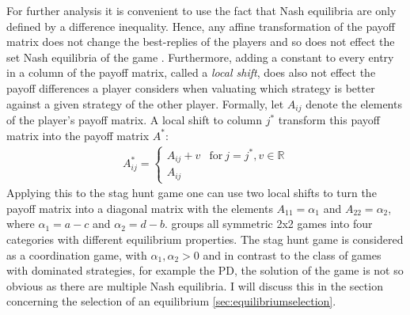 \documentclass[11pt]{article}
\newcommand{\realnumb}{\mathbb{R}}
\begin{document}
For further analysis it is convenient to use the fact that Nash equilibria 
are only defined by a difference inequality. 
Hence, any affine transformation of the payoff matrix does not change the 
best-replies of the players and so does not effect the set Nash equilibria 
of the game \parencite[17-19]{weibull_evolutionary_1997}. 
Furthermore, adding a constant to every entry in a column of the payoff matrix, 
called a \textit{local shift}, does also not effect the payoff differences
a player considers when valuating which strategy is better against a given
strategy of the other player.
Formally, let $A_{ij}$ denote the elements of the player's payoff matrix. 
A local shift to column $j^*$ transform this payoff matrix into the payoff 
matrix $A^*$:
\begin{align}
        A^*_{ij} =
        \begin{cases}
                A_{ij} + v & \text{for}\ j=j^*, v \in \realnumb \\
                A_{ij}
        \end{cases}
\end{align}
Applying this to the stag hunt game one can use two local shifts to turn 
the payoff matrix into a diagonal matrix with the elements $A_{11}=\alpha_1$ 
and $A_{22}=\alpha_2$, where $\alpha_1=a-c$ and $\alpha_2=d-b$. 
\textcite[28]{weibull_evolutionary_1997} groups all symmetric 2x2 games into 
four categories with different equilibrium properties. 
The stag hunt game is considered as a coordination 
game, with $\alpha_1, \alpha_2 > 0$ and in contrast to the class of games
with dominated strategies, for example the PD, the solution of the game
is not so obvious as there are multiple Nash equilibria.
I will discuss this in the section concerning the selection of an equilibrium 
\ref{sec:equilibriumselection}.
\end{document}
